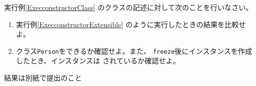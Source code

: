  \begin{Prob}\upshape
  実行例\else\ref{ExecconstructorClass}\fi
  のクラスの記述に対して次のことを行いなさい。
  \begin{enumerate}
   \item 実行例\else\ref{ExecconstructorExtensible}\fi
         のように実行したときの結果を比較せよ。
   \item クラス\texttt{Person}をできるか確認せよ。また、
         \texttt{freeze}後にインスタンスを作成したとき、インスタンスは
         されているか確認せよ。
  \end{enumerate}
 \end{Prob}
\ifText 結果は別紙で提出のこと\fi